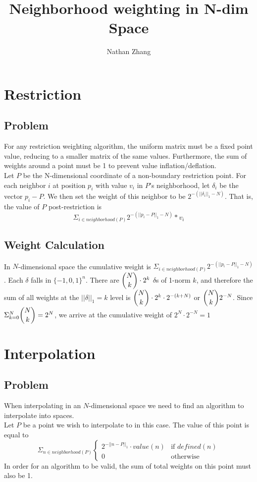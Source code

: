 \documentclass[11pt, oneside]{article}   	%
\title{Neighborhood weighting in N-dim Space}
\author{Nathan Zhang}
\begin{document}
\maketitle

\section{Restriction}
\subsection{Problem}
For any restriction weighting algorithm, the uniform matrix must be a fixed point value, reducing to a smaller matrix of the same values. Furthermore, the sum of weights around a point must be 1 to prevent value inflation/deflation.\\

Let $P$ be the N-dimensional coordinate of a non-boundary restriction point. For each neighbor $i$ at position $p_i$ with value $v_i$ in $P$'s neighborhood, let $\delta_i$ be the vector $p_i - P$. We then set the weight of this neighbor to be $2^{-(||\delta_i||_1 - N)}$. That is, the value of $P$ post-restriction is $$\Sigma_{i \in neighborhood(P)} 2^{-(||p_i - P||_1 - N)} * v_i$$

\subsection{Weight Calculation}
In $N$-dimensional space the cumulative weight is $\Sigma_{i \in neighborhood(P)} 2^{-(||p_i - P||_1 - N)}$. Each $\delta$ falls in $\{-1, 0, 1\}^n$. There are $\dbinom{N}{k} \cdot 2^k$ $\delta$s of 1-norm $k$, and therefore the sum of all weights at the $||\delta||_1=k$ level is $\dbinom{N}{k} \cdot 2^k \cdot 2^{-(k+N)}$ or $\dbinom{N}{k}2^{-N}$. Since $\Sigma_{k=0}^{N} \dbinom{N}{k} = 2^N$, we arrive at the cumulative weight of $2^N \cdot 2^{-N} = 1$

\section{Interpolation}
\subsection{Problem}
When interpolating in an $N$-dimensional space we need to find an algorithm to interpolate into spaces.\\

Let $P$ be a point we wish to interpolate to in this case. The value of this point is equal to 
$$
\Sigma_{n \in neighborhood(P)}
\begin{cases}
	2^{-||n-P||_1} \cdot value(n)& \text{if } defined(n)\\
	0 & \text{otherwise}
\end{cases}
$$
In order for an algorithm to be valid, the sum of total weights on this point must also be 1.
\end{document}

